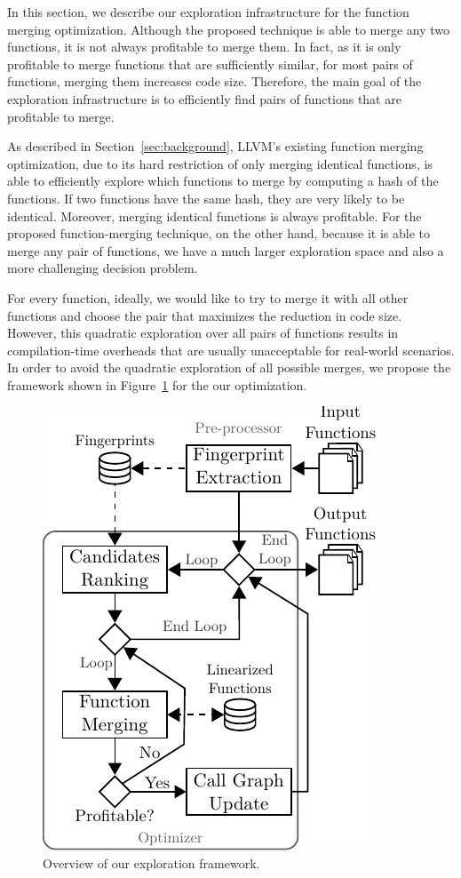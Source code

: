 In this section, we describe our exploration infrastructure for the 
function merging optimization.
Although the proposed technique is able to merge any two functions, it is not
always profitable to merge them.
In fact, as it is only profitable to merge functions that are sufficiently
similar, for most pairs of functions, merging them increases code size.
Therefore, the main goal of the exploration infrastructure is to efficiently
find pairs of functions that are profitable to merge.

As described in Section~\ref{sec:background}, LLVM's existing function merging
optimization, due to its hard restriction of only merging identical functions,
is able to  efficiently explore which functions to merge by computing a hash
of the functions.
If two functions have the same hash, they are very likely to be identical.
Moreover, merging identical functions is always profitable.
For the proposed function-merging technique, on the other hand, because it is
able to merge any pair of functions, we have a much larger exploration space and
also a more challenging decision problem.


For every function, ideally, we would like to try to merge it with all other
functions and choose the pair that maximizes the reduction in code size.
However, this quadratic exploration over all pairs of functions results in
compilation-time overheads that are usually unacceptable for real-world
scenarios.
In order to avoid the quadratic exploration of all possible merges, we propose
the framework shown in Figure~\ref{fig:func-merge-opt-arch} for the our
optimization.
\begin{figure}[h]
  \centering
  \includegraphics[width=0.65\linewidth]{figs/func-merge-opt-arch.pdf}
  \caption{Overview of our exploration framework.}
  \label{fig:func-merge-opt-arch}
\end{figure}

